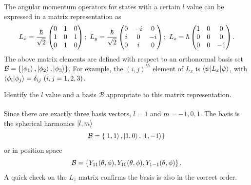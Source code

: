 \documentclass[11pt,letterpaper]{article}
\begin{document}
	\item
	The angular momentum operators for states with a certain $l$ value can be expressed in a matrix representation as
	\[
		L_x = \frac{\h}{\sqrt 2}\begin{pmatrix}0&1&0\\1&0&1\\0&1&0\end{pmatrix};\ 
		L_y = \frac{\h}{\sqrt 2}\begin{pmatrix}0&-i&0\\i&0&-i\\0&i&0\end{pmatrix};\ 
		L_z = \h\begin{pmatrix}1&0&0\\0&0&0\\0&0&-1\end{pmatrix}.
	\]
	The above matrix elements are defined with respect to an orthonormal basis set 
	$\mathcal{B} = \left\{\ket{\phi_1},\ket{\phi_2},\ket{\phi_3}\right\}$. For example, the $(i,j)^{th}$ element of $L_x$ is
	$\braket{\psi|L_x|\psi}$, with $\braket{\phi_i|\phi_j} = \delta_{ij}\ (i,j = 1,2,3)$. 
	\\
		\benum
		\item
		Identify the $l$ value and a basis $\mathcal B$ appropriate to this matrix representation.
		\\
		\\
		Since there are exactly three basis vectors, $l=1$ and $m = -1,0,1$. The basis is the spherical
		harmonics $\ket{l,m}$
		\[
			\mathcal B = \left\{\ket{1,1},\ket{1,0},\ket{1,-1}\right\}
		\]
		or in position space
		\[
			\mathcal B = \left\{Y_{11}(\theta,\phi),Y_{10}(\theta,\phi),Y_{1-1}(\theta,\phi)\right\}.
		\]
		A quick check on the $L_z$ matrix confirms the basis is also in the correct order.
		\\
		
\end{document}
